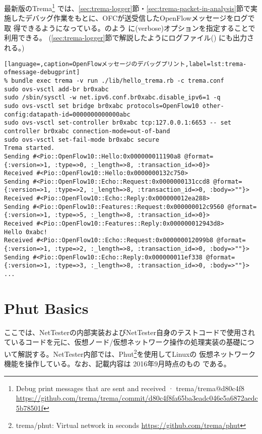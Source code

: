 最新版のTrema\footnote{Debug print messages that are sent and received ·
trema/trema@d80c4f8
\url{https://github.com/trema/trema/commit/d80c4f8fa65ba3eadc046e5a6872aedc5b78501f}}
では、\ref{sec:trema-logger}節・\ref{sec:trema-packet-in-analysis}節で実
施したデバッグ作業をもとに、OFCが送受信したOpenFlowメッセージをログで取
得できるようになっている。のよう
に(verbose)オプションを指定することで利用できる。
(\ref{sec:trema-logger}節で解説したようにログファイル()
にも出力される。)
\begin{lstlisting}[language=,caption=OpenFlowメッセージのデバッグプリント,label=lst:trema-ofmessage-debugprint]
% bundle exec trema -v run ./lib/hello_trema.rb -c trema.conf
sudo ovs-vsctl add-br br0xabc
sudo /sbin/sysctl -w net.ipv6.conf.br0xabc.disable_ipv6=1 -q
sudo ovs-vsctl set bridge br0xabc protocols=OpenFlow10 other-config:datapath-id=0000000000000abc
sudo ovs-vsctl set-controller br0xabc tcp:127.0.0.1:6653 -- set controller br0xabc connection-mode=out-of-band
sudo ovs-vsctl set-fail-mode br0xabc secure
Trema started.
Sending #<Pio::OpenFlow10::Hello:0x000000011190a8 @format={:version=>1, :type=>0, :_length=>8, :transaction_id=>0}>
Received #<Pio::OpenFlow10::Hello:0x0000000132c750>
Sending #<Pio::OpenFlow10::Echo::Request:0x0000000131ccd8 @format={:version=>1, :type=>2, :_length=>8, :transaction_id=>0, :body=>""}>
Received #<Pio::OpenFlow10::Echo::Reply:0x000000012ea288>
Sending #<Pio::OpenFlow10::Features::Request:0x000000012c9560 @format={:version=>1, :type=>5, :_length=>8, :transaction_id=>0}>
Received #<Pio::OpenFlow10::Features::Reply:0x000000012943d8>
Hello 0xabc!
Received #<Pio::OpenFlow10::Echo::Request:0x000000012099b8 @format={:version=>1, :type=>2, :_length=>8, :transaction_id=>0, :body=>""}>
Sending #<Pio::OpenFlow10::Echo::Reply:0x000000011ef338 @format={:version=>1, :type=>3, :_length=>8, :transaction_id=>0, :body=>""}>
...
\end{lstlisting}

\section{Phut Basics}
\label{sec:phut_basics}

ここでは、NetTesterの内部実装およびNetTester自身のテストコードで使用され
ているコードを元に、仮想ノード/仮想ネットワーク操作の処理実装の基礎につ
いて解説する。NetTester内部では、Phut\footnote{trema/phut: Virtual
network in seconds \url{https://github.com/trema/phut}}を使用してLinuxの
仮想ネットワーク機能を操作している。なお、記載内容は 2016年9月時点のもの
である。

